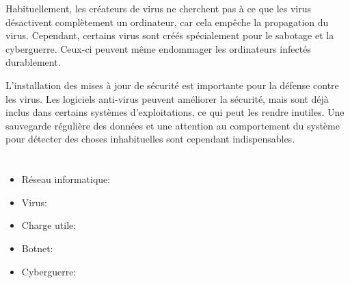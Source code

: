 {{Habituellement, les créateurs de virus ne cherchent pas à ce que les virus désactivent complètement un ordinateur, car cela empêche la propagation du virus. Cependant, certains virus sont créés spécialement pour le sabotage et la cyberguerre. Ceux-ci peuvent même endommager les ordinateurs infectés durablement.

L’installation des mises à jour de sécurité est importante pour la défense contre les virus. Les logiciels anti-virus peuvent améliorer la sécurité, mais sont déjà inclus dans certains systèmes d’exploitations, ce qui peut les rendre inutiles. Une sauvegarde régulière des données et une attention au comportement du système pour détecter des choses inhabituelles sont cependant indispensables.



\section*{\BrochureWebsitesAndKeywords}
{\raggedright
\begin{itemize}
  \item Réseau informatique: \href{https://fr.wikipedia.org/wiki/R\%C3\%A9seau_informatique}{}
  \item Virus: \href{https://fr.wikipedia.org/wiki/Virus_informatique}{}
  \item Charge utile: \href{https://fr.wikipedia.org/wiki/Charge_utile\#Informatique}{}
  \item Botnet: \href{https://fr.wikipedia.org/wiki/Botnet}{}
  \item Cyberguerre: \href{https://fr.wikipedia.org/wiki/Cyberguerre}{}
\end{itemize}


}

}{}

\def\AuthorClarkD{} %
\def\AuthorPhillippsM{} %
\def\AuthorBaumannW{} %
\def\AuthorDatzkoC{} %
\def\AuthorDatzkoS{} %
\def\AuthorPohlW{} %
\def\AuthorPelletE{} %

\newpage}{}
